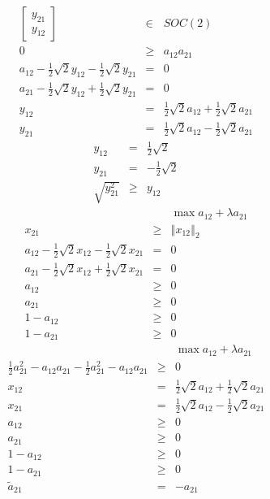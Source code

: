 \documentclass{article}
\begin{document}
\begin{eqnarray*}
\left[ 
\begin{array}{c}
y_{21} \\ 
y_{12}%
\end{array}%
\right]  &\in &SOC\left( 2\right)  \\
0 &\geq &a_{12}a_{21} \\
a_{12}-\frac{1}{2}\sqrt{2}y_{12}-\frac{1}{2}\sqrt{2}y_{21} &=&0 \\
a_{21}-\frac{1}{2}\sqrt{2}y_{12}+\frac{1}{2}\sqrt{2}y_{21} &=&0 \\
y_{12} &=&\frac{1}{2}\sqrt{2}a_{12}+\frac{1}{2}\sqrt{2}a_{21} \\
y_{21} &=&\frac{1}{2}\sqrt{2}a_{12}-\frac{1}{2}\sqrt{2}a_{21}
\end{eqnarray*}
\begin{eqnarray*}
y_{12} &=&\frac{1}{2}\sqrt{2} \\
y_{21} &=&-\frac{1}{2}\sqrt{2} \\
\sqrt{y_{21}^{2}} &\geq &y_{12}
\end{eqnarray*}%
\begin{eqnarray*}
&&\max a_{12}+\lambda a_{21} \\
x_{21} &\geq &\left\Vert x_{12}\right\Vert _{2} \\
a_{12}-\frac{1}{2}\sqrt{2}x_{12}-\frac{1}{2}\sqrt{2}x_{21} &=&0 \\
a_{21}-\frac{1}{2}\sqrt{2}x_{12}+\frac{1}{2}\sqrt{2}x_{21} &=&0 \\
a_{12} &\geq &0 \\
a_{21} &\geq &0 \\
1-a_{12} &\geq &0 \\
1-a_{21} &\geq &0
\end{eqnarray*}%
\begin{eqnarray*}
&&\max a_{12}+\lambda a_{21} \\
\frac{1}{2}a_{21}^{2}-a_{12}a_{21}-\frac{1}{2}a_{21}^{2}-a_{12}a_{21} &\geq
&0 \\
x_{12} &=&\frac{1}{2}\sqrt{2}a_{12}+\frac{1}{2}\sqrt{2}a_{21} \\
x_{21} &=&\frac{1}{2}\sqrt{2}a_{12}-\frac{1}{2}\sqrt{2}a_{21} \\
a_{12} &\geq &0 \\
a_{21} &\geq &0 \\
1-a_{12} &\geq &0 \\
1-a_{21} &\geq &0 \\
\tilde{a}_{21} &=&-a_{21}
\end{eqnarray*}
\end{document}
